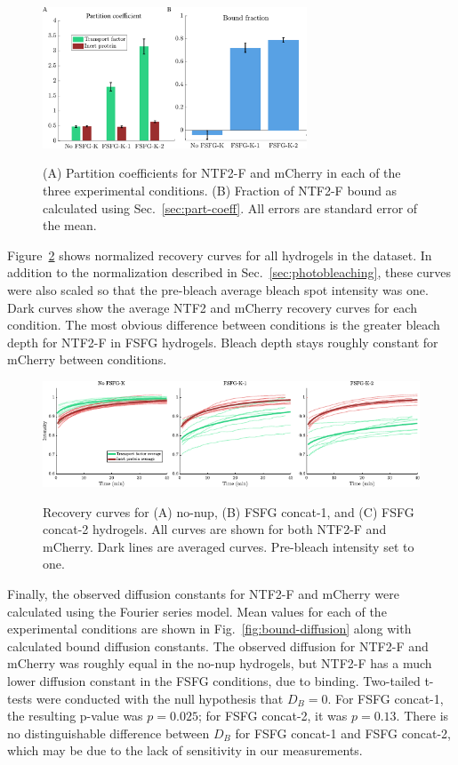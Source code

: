 \begin{figure}
\caption[Partition coefficients and fraction of NTF2 bound.]{(A) Partition coefficients for NTF2-F and mCherry in each of the three experimental conditions.  (B) Fraction of NTF2-F bound as calculated using Sec.~\ref{sec:part-coeff}.  All errors are standard error of the mean.\\}
\centering
\includegraphics[width=0.7\textwidth]{figs/ch04/fraction-bound}
\label{fig:frac-bound}
\end{figure} 

Figure~\ref{fig:curves} shows normalized recovery curves for all hydrogels in the dataset.  In addition to the normalization described in Sec.~\ref{sec:photobleaching}, these curves were also scaled so that the pre-bleach average bleach spot intensity was one.  Dark curves show the average NTF2 and mCherry recovery curves for each condition.  The most obvious difference between conditions is the greater bleach depth for NTF2-F in FSFG hydrogels.  Bleach depth stays roughly constant for mCherry between conditions.

\begin{figure}
\caption[Recovery curves.]{Recovery curves for (A) no-nup, (B) FSFG concat-1, and (C) FSFG concat-2 hydrogels.  All curves are shown for both NTF2-F and mCherry.  Dark lines are averaged curves.  Pre-bleach intensity set to one. \\}
\centering
\includegraphics[width=\textwidth]{figs/ch04/curves}
\label{fig:curves}
\end{figure} 

Finally, the observed diffusion constants for NTF2-F and mCherry were calculated using the Fourier series model.  Mean values for each of the experimental conditions are shown in Fig.~\ref{fig:bound-diffusion} along with calculated bound diffusion constants.  The observed diffusion for NTF2-F and mCherry was roughly equal in the no-nup hydrogels, but NTF2-F has a much lower diffusion constant in the FSFG conditions, due to binding.  Two-tailed t-tests were conducted with the null hypothesis that $D_B = 0$.  For FSFG concat-1, the resulting p-value was $p = 0.025$; for FSFG concat-2, it was $p = 0.13$.  There is no distinguishable difference between $D_B$ for FSFG concat-1 and FSFG concat-2, which may be due to the lack of sensitivity in our measurements.


